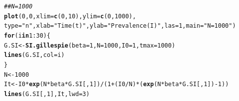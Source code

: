 \documentclass[12pt]{article}\usepackage[]{graphicx}\usepackage[]{color}
\makeatletter
\newcommand{\hlnum}[1]{\textcolor[rgb]{0.686,0.059,0.569}{#1}}%
\newcommand{\hlstr}[1]{\textcolor[rgb]{0.192,0.494,0.8}{#1}}%
\newcommand{\hlcom}[1]{\textcolor[rgb]{0.678,0.584,0.686}{\textit{#1}}}%
\newcommand{\hlopt}[1]{\textcolor[rgb]{0,0,0}{#1}}%
\newcommand{\hlstd}[1]{\textcolor[rgb]{0.345,0.345,0.345}{#1}}%
\newcommand{\hlkwa}[1]{\textcolor[rgb]{0.161,0.373,0.58}{\textbf{#1}}}%
\newcommand{\hlkwb}[1]{\textcolor[rgb]{0.69,0.353,0.396}{#1}}%
\newcommand{\hlkwc}[1]{\textcolor[rgb]{0.333,0.667,0.333}{#1}}%
\newcommand{\hlkwd}[1]{\textcolor[rgb]{0.737,0.353,0.396}{\textbf{#1}}}%
\newenvironment{kframe}{%
 \def\at@end@of@kframe{}%
 \ifinner\ifhmode%
  \def\at@end@of@kframe{\end{minipage}}%
  \begin{minipage}{\columnwidth}%
 \fi\fi%
 \def\FrameCommand##1{\hskip\@totalleftmargin \hskip-\fboxsep
 \colorbox{shadecolor}{##1}\hskip-\fboxsep
     \hskip-\linewidth \hskip-\@totalleftmargin \hskip\columnwidth}%
 \MakeFramed {\advance\hsize-\width
   \@totalleftmargin\z@ \linewidth\hsize
   \@setminipage}}%
 {\par\unskip\endMakeFramed%
 \at@end@of@kframe}
\newenvironment{knitrout}{}{} %
\makeatother
\begin{document}
\begin{enumerate}[(a)]
\begin{knitrout}
\begin{kframe}
\begin{alltt}
\hlcom{## N=1000}
\hlkwd{plot}\hlstd{(}\hlnum{0}\hlstd{,}\hlnum{0}\hlstd{,}\hlkwc{xlim}\hlstd{=}\hlkwd{c}\hlstd{(}\hlnum{0}\hlstd{,}\hlnum{10}\hlstd{),}\hlkwc{ylim}\hlstd{=}\hlkwd{c}\hlstd{(}\hlnum{0}\hlstd{,}\hlnum{1000}\hlstd{),}
     \hlkwc{type}\hlstd{=}\hlstr{"n"}\hlstd{,}\hlkwc{xlab}\hlstd{=}\hlstr{"Time (t)"}\hlstd{,}\hlkwc{ylab}\hlstd{=}\hlstr{"Prevalence (I)"}\hlstd{,}\hlkwc{las}\hlstd{=}\hlnum{1}\hlstd{,} \hlkwc{main} \hlstd{=} \hlstr{"N = 1000"}\hlstd{)}
\hlkwa{for}\hlstd{(i} \hlkwa{in} \hlnum{1}\hlopt{:}\hlnum{30}\hlstd{)\{}
  \hlstd{G.SI} \hlkwb{<-} \hlkwd{SI.gillespie}\hlstd{(}\hlkwc{beta}\hlstd{=}\hlnum{1}\hlstd{,} \hlkwc{N}\hlstd{=}\hlnum{1000}\hlstd{,} \hlkwc{I0}\hlstd{=}\hlnum{1}\hlstd{,} \hlkwc{tmax}\hlstd{=}\hlnum{1000}\hlstd{)}
  \hlkwd{lines}\hlstd{(G.SI,} \hlkwc{col}\hlstd{=i)}
\hlstd{\}}
\hlstd{N} \hlkwb{<-} \hlnum{1000}
\hlstd{It} \hlkwb{<-} \hlstd{I0}\hlopt{*}\hlkwd{exp}\hlstd{(N}\hlopt{*}\hlstd{beta}\hlopt{*}\hlstd{G.SI[,}\hlnum{1}\hlstd{])}\hlopt{/}\hlstd{(}\hlnum{1}\hlopt{+}\hlstd{(I0}\hlopt{/}\hlstd{N)}\hlopt{*}\hlstd{(}\hlkwd{exp}\hlstd{(N}\hlopt{*}\hlstd{beta}\hlopt{*}\hlstd{G.SI[,}\hlnum{1}\hlstd{])}\hlopt{-}\hlnum{1}\hlstd{))}
\hlkwd{lines}\hlstd{(G.SI[,}\hlnum{1}\hlstd{],It,}\hlkwc{lwd}\hlstd{=}\hlnum{3}\hlstd{)}


\end{alltt}
\end{kframe}
\end{knitrout}
\end{enumerate}
\end{document}
